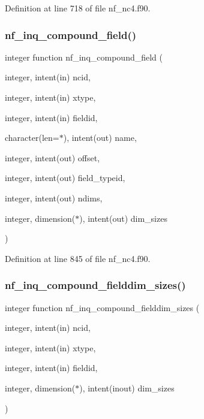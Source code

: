 Definition at line 718 of file nf\+\_\+nc4.\+f90.

\mbox{\label{nf__nc4_8f90_a43383646bdaf42eb59b94b00f90aaafd}} 
\subsubsection{\texorpdfstring{nf\+\_\+inq\+\_\+compound\+\_\+field()}{nf\_inq\_compound\_field()}}
{\footnotesize\ttfamily integer function nf\+\_\+inq\+\_\+compound\+\_\+field (\begin{DoxyParamCaption}\item[{integer, intent(in)}]{ncid,  }\item[{integer, intent(in)}]{xtype,  }\item[{integer, intent(in)}]{fieldid,  }\item[{character(len=$\ast$), intent(out)}]{name,  }\item[{integer, intent(out)}]{offset,  }\item[{integer, intent(out)}]{field\+\_\+typeid,  }\item[{integer, intent(out)}]{ndims,  }\item[{integer, dimension($\ast$), intent(out)}]{dim\+\_\+sizes }\end{DoxyParamCaption})}



Definition at line 845 of file nf\+\_\+nc4.\+f90.

\mbox{\label{nf__nc4_8f90_a32b52a996075c7a99a8ced71f7b8ab04}} 
\subsubsection{\texorpdfstring{nf\+\_\+inq\+\_\+compound\+\_\+fielddim\+\_\+sizes()}{nf\_inq\_compound\_fielddim\_sizes()}}
{\footnotesize\ttfamily integer function nf\+\_\+inq\+\_\+compound\+\_\+fielddim\+\_\+sizes (\begin{DoxyParamCaption}\item[{integer, intent(in)}]{ncid,  }\item[{integer, intent(in)}]{xtype,  }\item[{integer, intent(in)}]{fieldid,  }\item[{integer, dimension($\ast$), intent(inout)}]{dim\+\_\+sizes }\end{DoxyParamCaption})}



